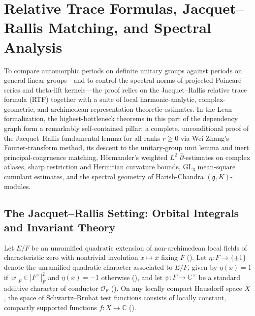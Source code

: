 \section{Relative Trace Formulas, Jacquet--Rallis Matching, and Spectral Analysis}
\label{sec:ch03-rtf-jacquet-rallis-analysis}

To compare automorphic periods on definite unitary groups against periods on
general linear groups---and to control the spectral norms of projected
Poincar\'e series and theta-lift kernels---the proof relies on the
Jacquet--Rallis relative trace formula (RTF) together with a suite of local
harmonic-analytic, complex-geometric, and archimedean representation-theoretic
estimates.
In the Lean formalization, the highest-bottleneck theorems in this part of the
dependency graph form a remarkably self-contained pillar: a complete,
unconditional proof of the Jacquet--Rallis fundamental lemma for all ranks
$r \ge 0$ via Wei Zhang's Fourier-transform method, its descent to the
unitary-group unit lemma and inert principal-congruence matching, H\"ormander's
weighted $L^2$ $\bar{\partial}$-estimates on complex atlases, sharp restriction
and Hermitian curvature bounds, $\mathrm{GL}_3$ mean-square cumulant estimates,
and the spectral geometry of Harish-Chandra $(\mathfrak{g}, K)$-modules.

\subsection{The Jacquet--Rallis Setting: Orbital Integrals and Invariant Theory}
\label{subsec:ch03-jr-setup}

Let $E/F$ be an unramified quadratic extension of non-archimedean local fields
of characteristic zero with nontrivial involution $x \mapsto \bar{x}$ fixing
$F$ ().
Let $\eta : F \to \{\pm 1\}$ denote the unramified quadratic character
associated to $E/F$, given by $\eta(x) = 1$ if $|x|_F \in |F^{\times}|_F^2$ and
$\eta(x) = -1$ otherwise (), and let
$\psi : F \to \mathbb{C}^{\times}$ be a standard additive character of
conductor $\mathcal{O}_F$ ().
On any locally compact Hausdorff space $X$, the space of Schwartz--Bruhat test
functions consists of locally constant, compactly supported functions
$f : X \to \mathbb{C}$ ().

